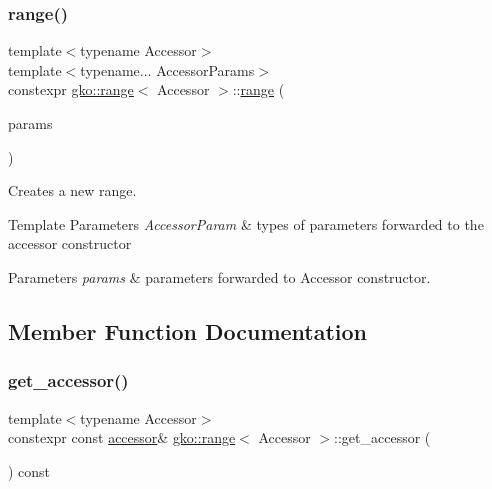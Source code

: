 \subsubsection{\texorpdfstring{range()}{range()}}
{\footnotesize\ttfamily template$<$typename Accessor$>$ \\
template$<$typename... Accessor\+Params$>$ \\
constexpr \hyperlink{classgko_1_1range}{gko\+::range}$<$ Accessor $>$\+::\hyperlink{classgko_1_1range}{range} (\begin{DoxyParamCaption}\item[{Accessor\+Params \&\&...}]{params }\end{DoxyParamCaption})\hspace{0.3cm}{\ttfamily [explicit]}}



Creates a new range. 


\begin{DoxyTemplParams}{Template Parameters}
{\em Accessor\+Param} & types of parameters forwarded to the accessor constructor\\
\hline
\end{DoxyTemplParams}

\begin{DoxyParams}{Parameters}
{\em params} & parameters forwarded to Accessor constructor. \\
\hline
\end{DoxyParams}


\subsection{Member Function Documentation}
\mbox{\label{classgko_1_1range_ac62f76256fce7442670275827e32d506}} 
\subsubsection{\texorpdfstring{get\+\_\+accessor()}{get\_accessor()}}
{\footnotesize\ttfamily template$<$typename Accessor$>$ \\
constexpr const \hyperlink{classgko_1_1range_a3332728e51dadcf6517847cef3000a17}{accessor}\& \hyperlink{classgko_1_1range}{gko\+::range}$<$ Accessor $>$\+::get\+\_\+accessor (\begin{DoxyParamCaption}{ }\end{DoxyParamCaption}) const\hspace{0.3cm}{\ttfamily [noexcept]}}



